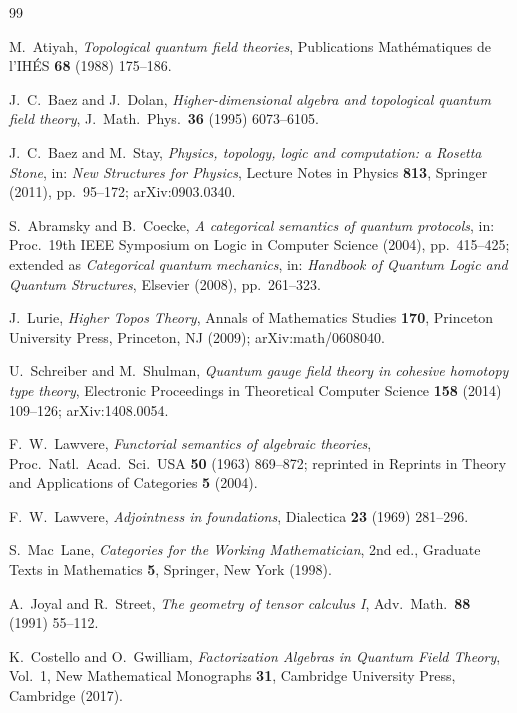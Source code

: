 \documentclass[12pt]{article}
\theoremstyle{definition}
\theoremstyle{remark}
\begin{document}
\begin{thebibliography}{99}

M.~Atiyah,
\emph{Topological quantum field theories},
Publications Math\'ematiques de l'IH\'ES \textbf{68} (1988) 175--186.

J.~C.~Baez and J.~Dolan,
\emph{Higher-dimensional algebra and topological quantum field theory},
J.\ Math.\ Phys.\ \textbf{36} (1995) 6073--6105.

J.~C.~Baez and M.~Stay,
\emph{Physics, topology, logic and computation: a Rosetta Stone},
in: \emph{New Structures for Physics}, Lecture Notes in Physics \textbf{813}, Springer (2011), pp.~95--172; arXiv:0903.0340.

S.~Abramsky and B.~Coecke,
\emph{A categorical semantics of quantum protocols},
in: Proc.\ 19th IEEE Symposium on Logic in Computer Science (2004), pp.~415--425; extended as \emph{Categorical quantum mechanics}, in: \emph{Handbook of Quantum Logic and Quantum Structures}, Elsevier (2008), pp.~261--323.

J.~Lurie,
\emph{Higher Topos Theory},
Annals of Mathematics Studies \textbf{170}, Princeton University Press, Princeton, NJ (2009); arXiv:math/0608040.

U.~Schreiber and M.~Shulman,
\emph{Quantum gauge field theory in cohesive homotopy type theory},
Electronic Proceedings in Theoretical Computer Science \textbf{158} (2014) 109--126; arXiv:1408.0054.

F.~W.~Lawvere,
\emph{Functorial semantics of algebraic theories},
Proc.\ Natl.\ Acad.\ Sci.\ USA \textbf{50} (1963) 869--872; reprinted in Reprints in Theory and Applications of Categories \textbf{5} (2004).

F.~W.~Lawvere,
\emph{Adjointness in foundations},
Dialectica \textbf{23} (1969) 281--296.

S.~Mac~Lane,
\emph{Categories for the Working Mathematician},
2nd ed., Graduate Texts in Mathematics \textbf{5}, Springer, New York (1998).

A.~Joyal and R.~Street,
\emph{The geometry of tensor calculus I},
Adv.\ Math.\ \textbf{88} (1991) 55--112.

K.~Costello and O.~Gwilliam,
\emph{Factorization Algebras in Quantum Field Theory}, Vol.~1,
New Mathematical Monographs \textbf{31}, Cambridge University Press, Cambridge (2017).


\end{thebibliography}
\end{document}
